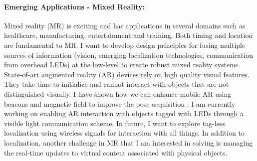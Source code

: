 \documentclass[10pt]{article}
\begin{document}
\paragraph{Emerging Applications - Mixed Reality: }
Mixed reality (MR) is exciting and has applications in several domains such as healthcare, manufacturing, entertainment and training. Both timing and location are fundamental to MR. I want to develop design principles for fusing multiple sources of information (vision, emerging localization technologies, communication from overhead LEDs) at the low-level to create robust mixed reality systems. 
State-of-art augmented reality (AR) devices rely on high quality visual features. They take time to initialize and cannot interact with objects that are not distinguished visually. I have shown how we can enhance mobile AR using beacons and magnetic field to improve the pose acquisition \cite{mobileAR}. I am currently working on enabling AR interaction with objects tagged with LEDs through a visible light communication scheme. In future, I want to explore tag-less localization using wireless signals for interaction with all things. In addition to localization, another challenge in MR that I am interested in solving is managing the real-time updates to virtual content associated with physical objects. 
\end{document}
